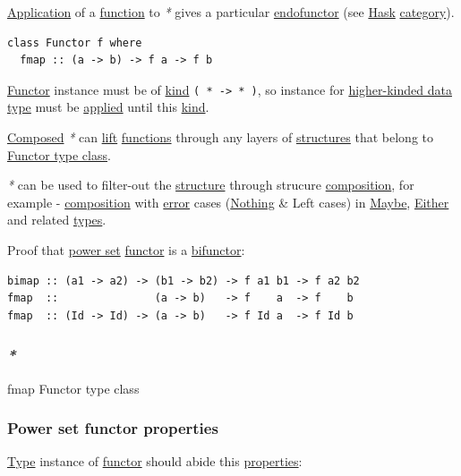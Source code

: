 \documentclass[a4paper,14pt,oneside]{book}
\begin{document}
\hyperref[org633a5a4]{Application} of a \hyperref[org50bbe06]{function} to \emph{*} gives a particular \hyperref[org51b87cf]{endofunctor} (see \hyperref[orge9ae2dc]{Hask} \hyperref[org77f032a]{category}).

\begin{verbatim}
class Functor f where
  fmap :: (a -> b) -> f a -> f b
\end{verbatim}

\hyperref[org878310f]{Functor} instance must be of \hyperref[org5dad8af]{kind} \texttt{( * -> * )}, so instance for \hyperref[org3f22a1c]{higher-kinded data type} must be \hyperref[orga10c745]{applied} until this \hyperref[org5dad8af]{kind}.

\hyperref[orgdee06ec]{Composed} \emph{*} can \hyperref[org7d3a14c]{lift} \hyperref[org6776c75]{functions} through any layers of \hyperref[orgadf8630]{structures} that belong to \hyperref[org3e9f765]{Functor type class}.

\emph{*} can be used to filter-out the \hyperref[org156091f]{structure} through strucure \hyperref[org2721976]{composition}, for example - \hyperref[org2721976]{composition} with \hyperref[orgc09ac90]{error} cases (\hyperref[orgc5d89bf]{Nothing} \& Left cases) in \hyperref[org6553a85]{Maybe}, \hyperref[org8eec108]{Either} and related \hyperref[org071cf6a]{types}.

Proof that \hyperref[orgef6b1a8]{power set} \hyperref[org878310f]{functor} is a \hyperref[org5c63dbf]{bifunctor}:

\begin{verbatim}
bimap :: (a1 -> a2) -> (b1 -> b2) -> f a1 b1 -> f a2 b2
fmap  ::               (a -> b)   -> f    a  -> f    b
fmap  :: (Id -> Id) -> (a -> b)   -> f Id a  -> f Id b 
\end{verbatim}

\subsubsection{\emph{*}}
\label{sec:org2823a45}

\label{orgd7386d7}fmap
\label{org3e9f765}Functor type class

\subsubsection{\label{orgfed9a44}Power set functor properties}
\label{sec:org0fdd662}
\hyperref[org6e832de]{Type} instance of \hyperref[org878310f]{functor} should abide this \hyperref[org85e959c]{properties}:
\end{document}

